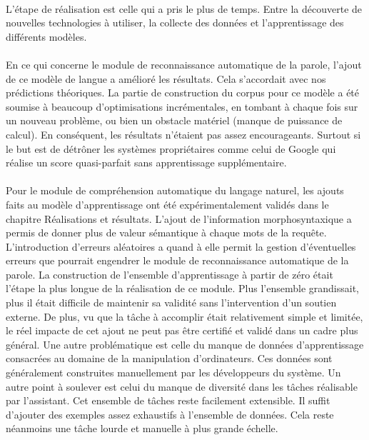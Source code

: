 \paragraph{}
L'étape de réalisation est celle qui a pris le plus de temps. Entre la découverte de nouvelles technologies à utiliser, la collecte des données et l'apprentissage des différents modèles.
\paragraph{}
En ce qui concerne le module de reconnaissance automatique de la parole, l'ajout de ce modèle de langue a amélioré les résultats. Cela s'accordait avec nos prédictions théoriques. La partie de construction du corpus pour ce modèle a été soumise à beaucoup d'optimisations incrémentales, en tombant à chaque fois sur un nouveau problème, ou bien un obstacle matériel (manque de puissance de calcul). En conséquent, les résultats n'étaient pas assez encourageants. Surtout si le but est de détrôner les systèmes propriétaires comme celui de Google qui réalise un score quasi-parfait sans apprentissage supplémentaire.

\paragraph{}


Pour le module de compréhension automatique du langage naturel, les ajouts faits au modèle d'apprentissage ont été expérimentalement validés dans le chapitre Réalisations et résultats. L'ajout de l'information morphosyntaxique a permis de donner plus de valeur sémantique à chaque mots de la requête. L'introduction d'erreurs aléatoires a quand à elle permit la gestion d'éventuelles erreurs que pourrait engendrer le module de reconnaissance automatique de la parole. La construction de l'ensemble d'apprentissage à partir de zéro était l'étape la plus longue de la réalisation de ce module. Plus l'ensemble grandissait, plus il était difficile de maintenir sa validité sans l'intervention d'un soutien externe. De plus, vu que la tâche à accomplir était relativement simple et limitée, le réel impacte de cet ajout ne peut pas être certifié et validé dans un cadre plus général. Une autre problématique est celle du manque de données d'apprentissage consacrées au domaine de la manipulation d'ordinateurs. Ces données sont généralement construites manuellement par les développeurs du système. Un autre point à soulever est celui du manque de diversité dans les tâches réalisable par l'assistant. Cet ensemble de tâches reste facilement extensible. Il suffit d'ajouter des exemples assez exhaustifs à l'ensemble de données. Cela reste néanmoins une tâche lourde et manuelle à plus grande échelle.

